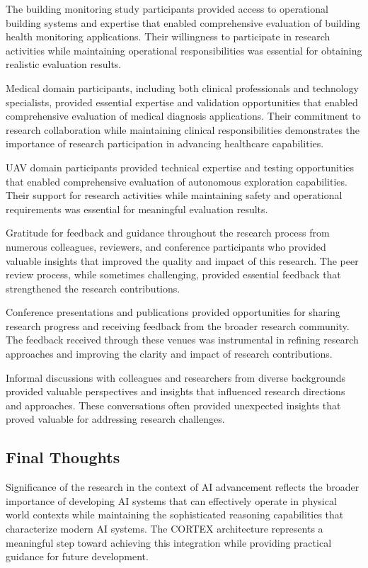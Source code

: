 The building monitoring study participants provided access to operational building systems and expertise that enabled comprehensive evaluation of building health monitoring applications. Their willingness to participate in research activities while maintaining operational responsibilities was essential for obtaining realistic evaluation results.

Medical domain participants, including both clinical professionals and technology specialists, provided essential expertise and validation opportunities that enabled comprehensive evaluation of medical diagnosis applications. Their commitment to research collaboration while maintaining clinical responsibilities demonstrates the importance of research participation in advancing healthcare capabilities.

UAV domain participants provided technical expertise and testing opportunities that enabled comprehensive evaluation of autonomous exploration capabilities. Their support for research activities while maintaining safety and operational requirements was essential for meaningful evaluation results.

Gratitude for feedback and guidance throughout the research process from numerous colleagues, reviewers, and conference participants who provided valuable insights that improved the quality and impact of this research. The peer review process, while sometimes challenging, provided essential feedback that strengthened the research contributions.

Conference presentations and publications provided opportunities for sharing research progress and receiving feedback from the broader research community. The feedback received through these venues was instrumental in refining research approaches and improving the clarity and impact of research contributions.

Informal discussions with colleagues and researchers from diverse backgrounds provided valuable perspectives and insights that influenced research directions and approaches. These conversations often provided unexpected insights that proved valuable for addressing research challenges.

\subsection{Final Thoughts}

Significance of the research in the context of AI advancement reflects the broader importance of developing AI systems that can effectively operate in physical world contexts while maintaining the sophisticated reasoning capabilities that characterize modern AI systems. The CORTEX architecture represents a meaningful step toward achieving this integration while providing practical guidance for future development.

